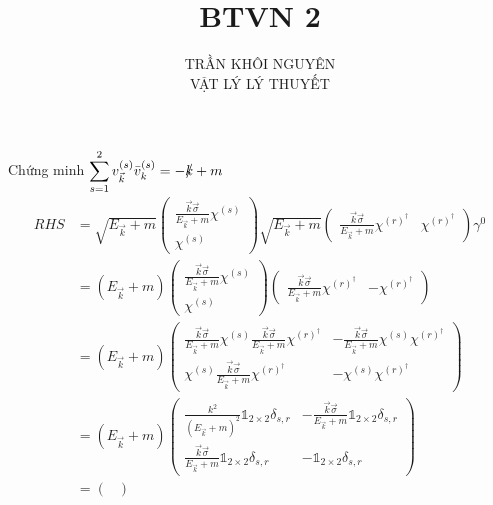 \documentclass{report}
\title{\Huge{BTVN 2}}
\begin{document}
\setlength{\parindent}{20pt}
\newpage
\author{TRẦN KHÔI NGUYÊN \\ VẬT LÝ LÝ THUYẾT}
\maketitle

Chứng minh $\displaystyle\sum_{s=1}^{2} v_{\vec{k}}^{(s)} \bar{v}_{k}^{(s)} = -\slashed{k} + m $
\begin{align*}
	RHS 
	&= \sqrt{E_{\vec{k}} + m } 
	\begin{pmatrix}
		\frac{\vec{k}\vec{\sigma}}{E_{\vec{k}} + m } \chi^{(s)} \\
		\chi^{(s)}
	\end{pmatrix}
	\sqrt{E_{\vec{k}} + m }
	\begin{pmatrix}
		\frac{\vec{k}\vec{\sigma}}{E_{\vec{k}} + m } \chi^{(r)^{\dagger} } &\chi^{(r)^{\dagger} } 
	\end{pmatrix}\gamma^0 \\
	&= 	(E_{\vec{k}} + m)
	\begin{pmatrix}
		\frac{\vec{k}\vec{\sigma}}{E_{\vec{k}} + m } \chi^{(s)} \\
		\chi^{(s)}
	\end{pmatrix}
	\begin{pmatrix}
		\frac{\vec{k}\vec{\sigma}}{E_{\vec{k}} + m } \chi^{(r)^{\dagger} } &-\chi^{(r)^{\dagger} } 
	\end{pmatrix} \\
	&=(E_{\vec{k}} + m)
	\begin{pmatrix}
		\frac{\vec{k}\vec{\sigma}}{E_{\vec{k}} + m } \chi^{(s)} \frac{\vec{k}\vec{\sigma}}{E_{\vec{k}} + m } \chi^{(r)^{\dagger} } & - \frac{\vec{k}\vec{\sigma}}{E_{\vec{k}} + m } \chi^{(s)}\chi^{(r)^{\dagger} } \\
		\chi^{(s)} \frac{\vec{k}\vec{\sigma}}{E_{\vec{k}} + m } \chi^{(r)^{\dagger} } & -\chi^{(s)}\chi^{(r)^{\dagger}}
	\end{pmatrix}\\
	&=(E_{\vec{k}} + m)
	\begin{pmatrix}
		 \frac{k^2}{(E_{\vec{k}} + m)^2 } \mathbb{1}_{2\times2}\delta_{s,r} & - \frac{\vec{k}\vec{\sigma}}{E_{\vec{k}} + m} \mathbb{1}_{2\times2}\delta_{s,r} \\
		 \frac{\vec{k}\vec{\sigma}}{E_{\vec{k}} + m}\mathbb{1}_{2\times2}\delta_{s,r} & -\mathbb{1}_{2\times2}\delta_{s,r}
	\end{pmatrix}\\
	&=
	\begin{pmatrix}

\end{pmatrix}
\end{align*}
\end{document}
